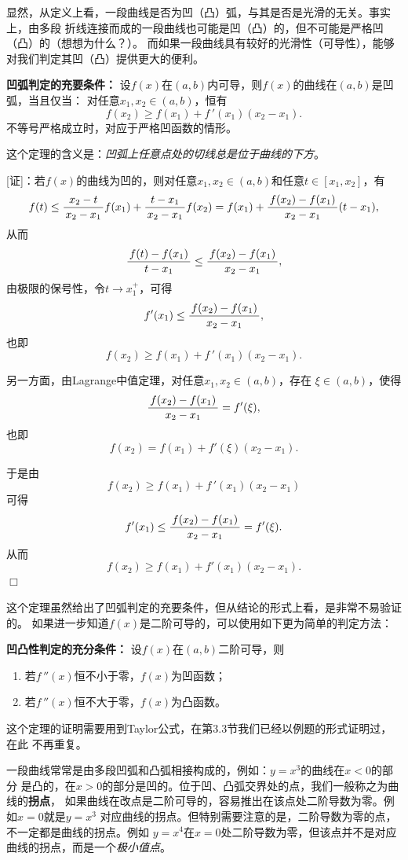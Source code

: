 显然，从定义上看，一段曲线是否为凹（凸）弧，与其是否是光滑的无关。事实上，由多段
折线连接而成的一段曲线也可能是凹（凸）的，但不可能是严格凹（凸）的（想想为什么？）。
而如果一段曲线具有较好的光滑性（可导性），能够对我们判定其凹（凸）提供更大的便利。

\begin{thx}
	{\bf 凹弧判定的充要条件：}
	设$f(x)$在$(a,b)$内可导，则$f(x)$的曲线在$(a,b)$是凹弧，当且仅当：
	对任意$x_1,x_2\in(a,b)$，恒有
	$$f(x_2)\geq f(x_1)+f\,'(x_1)(x_2-x_1). $$
	不等号严格成立时，对应于严格凹函数的情形。
\end{thx}
这个定理的含义是：{\it 凹弧上任意点处的切线总是位于曲线的下方}。

[证]：若$f(x)$的曲线为凹的，则对任意$x_1,x_2\in(a,b)$和任意$t\in[x_1,x_2]$，有
$$f(t)\leq\displaystyle\frac{\,{x_2-t}\,}{\,{x_2-x_1}\,}f(x_1)+\displaystyle\frac{\,{t-x_1}\,}{\,{x_2-x_1}\,}f(x_2)
=f(x_1)+\displaystyle\frac{\,{f(x_2)-f(x_1)}\,}{\,{x_2-x_1}\,}(t-x_1),$$
从而
$$\displaystyle\frac{\,{f(t)-f(x_1)}\,}{\,{t-x_1}\,}\leq\displaystyle\frac{\,{f(x_2)-f(x_1)}\,}{\,{x_2-x_1}\,},$$
由极限的保号性，令$t\to x_1^+$，可得
$$f'(x_1)\leq\displaystyle\frac{\,{f(x_2)-f(x_1)}\,}{\,{x_2-x_1}\,},$$
也即
$$f(x_2)\geq f(x_1)+f\,'(x_1)(x_2-x_1).$$

另一方面，由Lagrange中值定理，对任意$x_1,x_2\in(a,b)$，存在
$\xi\in(a,b)$，使得
$$\displaystyle\frac{\,{f(x_2)-f(x_1)}\,}{\,{x_2-x_1}\,}=f'(\xi),$$
也即
$$f(x_2)=f(x_1)+f'(\xi)(x_2-x_1).$$

于是由
$$f(x_2)\geq f(x_1)+f\,'(x_1)(x_2-x_1)$$
可得
$$f'(x_1)\leq\displaystyle\frac{\,{f(x_2)-f(x_1)}\,}{\,{x_2-x_1}\,}=f'(\xi).$$
从而
$$f(x_2)\geq f(x_1)+f'(x_1)(x_2-x_1).$$
\hfill$\Box$

这个定理虽然给出了凹弧判定的充要条件，但从结论的形式上看，是非常不易验证的。
如果进一步知道$f(x)$是二阶可导的，可以使用如下更为简单的判定方法：

\begin{thx}
	{\bf 凹凸性判定的充分条件：}
	设$f(x)$在$(a,b)$二阶可导，则
	\begin{enumerate}[(1)]
	  \item 若$f\,''(x)$恒不小于零，$f(x)$为凹函数；
	  \item 若$f\,''(x)$恒不大于零，$f(x)$为凸函数。
	\end{enumerate}
\end{thx}

这个定理的证明需要用到Taylor公式，在第3.3节我们已经以例题的形式证明过，在此
不再重复。

一段曲线常常是由多段凹弧和凸弧相接构成的，例如：$y=x^3$的曲线在$x<0$的部分
是凸的，在$x>0$的部分是凹的。位于凹、凸弧交界处的点，我们一般称之为曲线的{\bf 拐点}，
如果曲线在改点是二阶可导的，容易推出在该点处二阶导数为零。例如$x=0$就是$y=x^3$
对应曲线的拐点。但特别需要注意的是，二阶导数为零的点，不一定都是曲线的拐点。例如
$y=x^4$在$x=0$处二阶导数为零，但该点并不是对应曲线的拐点，而是一个{\it 极小值点}。

